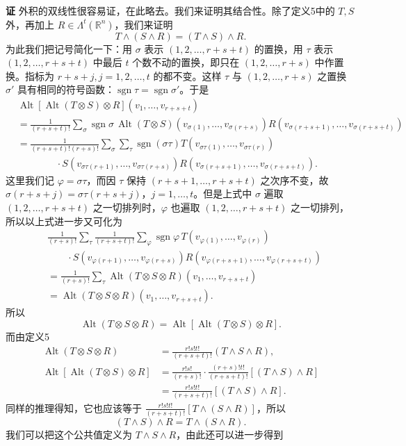 \noindent\textbf{证}
外积的双线性很容易证，在此略去。我们来证明其结合性。除了定义5中的 $T,S$ 外，再加上 $R\in\Lambda^t(\mathbb R^n)$，我们来证明
\[
 T\wedge(S\wedge R)=(T\wedge S)\wedge R.
\]
为此我们把记号简化一下：用 $\sigma$ 表示 $(1,2,\ldots,r+s+t)$ 的置换，用 $\tau$ 表示 $(1,2,\ldots,r+s+t)$ 中最后 $t$ 个数不动的置换，即只在 $(1,2,\ldots,r+s)$ 中作置换。指标为 $r+s+j,j=1,2,\ldots,t$ 的都不变。这样 $\tau$ 与 $(1,2,\ldots,r+s)$ 之置换 $\sigma'$ 具有相同的符号函数：$\operatorname{sgn}\tau=\operatorname{sgn}\sigma'$。于是
\begin{align*}
 &\operatorname{Alt}[\operatorname{Alt}(T\otimes S)\otimes R](v_1,\ldots,v_{r+s+t})\\
 &=\frac1{(r+s+t)!}\sum_\sigma\operatorname{sgn}\sigma\,
 \operatorname{Alt}(T\otimes S)(v_{\sigma(1)},\ldots,v_{\sigma(r+s)})
 R(v_{\sigma(r+s+1)},\ldots,v_{\sigma(r+s+t)})\\
 &=\frac1{(r+s+t)!(r+s)!}\sum_\sigma\sum_\tau
 \operatorname{sgn}(\sigma\tau)
 T(v_{\sigma\tau(1)},\ldots,v_{\sigma\tau(r)})\\
 &\qquad\qquad\cdot S(v_{\sigma\tau(r+1)},\ldots,v_{\sigma\tau(r+s)})
 R(v_{\sigma(r+s+1)},\ldots,v_{\sigma(r+s+t)}).
\end{align*}
这里我们记 $\varphi=\sigma\tau$，而因 $\tau$ 保持 $(r+s+1,\ldots,r+s+t)$ 之次序不变，故 $\sigma(r+s+j)=\sigma\tau(r+s+j)$，$j=1,\ldots,t$。但是上式中 $\sigma$ 遍取 $(1,2,\ldots,r+s+t)$ 之一切排列时，$\varphi$ 也遍取 $(1,2,\ldots,r+s+t)$ 之一切排列，所以以上式进一步又可化为
\begin{align*}
 &\frac1{(r+s)!}\sum_\tau\frac1{(r+s+t)!}\sum_\varphi\operatorname{sgn}\varphi\,
 T(v_{\varphi(1)},\ldots,v_{\varphi(r)})\\
 &\qquad\cdot S(v_{\varphi(r+1)},\ldots,v_{\varphi(r+s)})
 R(v_{\varphi(r+s+1)},\ldots,v_{\varphi(r+s+t)})\\
 &=\frac1{(r+s)!}\sum_\tau \operatorname{Alt}(T\otimes S\otimes R)(v_1,\ldots,v_{r+s+t})\\
 &=\operatorname{Alt}(T\otimes S\otimes R)(v_1,\ldots,v_{r+s+t}).
\end{align*}
所以
\[
 \operatorname{Alt}(T\otimes S\otimes R)
 =\operatorname{Alt}[\operatorname{Alt}(T\otimes S)\otimes R].
\]
而由定义5
\begin{align*}
 \operatorname{Alt}(T\otimes S\otimes R)
 &=\frac{r!s!t!}{(r+s+t)!}(T\wedge S\wedge R),\\
 \operatorname{Alt}[\operatorname{Alt}(T\otimes S)\otimes R]
 &=\frac{r!s!}{(r+s)!}\cdot\frac{(r+s)!t!}{(r+s+t)!}[(T\wedge S)\wedge R]\\
 &=\frac{r!s!t!}{(r+s+t)!}[(T\wedge S)\wedge R].
\end{align*}
同样的推理得知，它也应该等于 $\frac{r!s!t!}{(r+s+t)!}[T\wedge(S\wedge R)]$，所以
\[
 (T\wedge S)\wedge R=T\wedge(S\wedge R).
\]
我们可以把这个公共值定义为 $T\wedge S\wedge R$，由此还可以进一步得到

